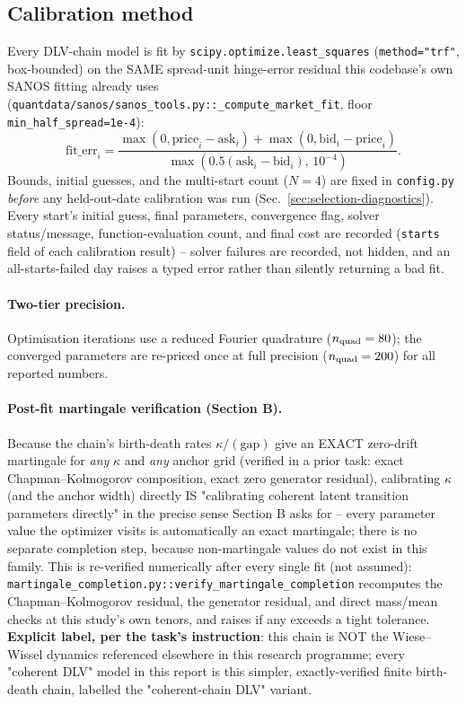 \subsection{Calibration method}
\label{sec:calibration-method}

Every DLV-chain model is fit by \texttt{scipy.optimize.least\_squares}
(\texttt{method="trf"}, box-bounded) on the SAME spread-unit hinge-error
residual this codebase's own SANOS fitting already uses
(\texttt{quantdata/sanos/sanos\_tools.py::\_compute\_market\_fit}, floor
\texttt{min\_half\_spread=1e-4}):
\[
  \text{fit\_err}_i = \frac{\max(0,\text{price}_i-\text{ask}_i) + \max(0,\text{bid}_i-\text{price}_i)}
                            {\max(0.5(\text{ask}_i-\text{bid}_i),\,10^{-4})}.
\]
Bounds, initial guesses, and the multi-start count ($N=4$) are fixed in
\texttt{config.py} \emph{before} any held-out-date calibration was run
(Sec.~\ref{sec:selection-diagnostics}). Every start's initial guess, final
parameters, convergence flag, solver status/message, function-evaluation
count, and final cost are recorded (\texttt{starts} field of each
calibration result) -- solver failures are recorded, not hidden, and an
all-starts-failed day raises a typed error rather than silently returning a
bad fit.

\paragraph{Two-tier precision.} Optimisation iterations use a reduced
Fourier quadrature ($n_{\rm quad}=80$); the converged parameters are
re-priced once at full precision ($n_{\rm quad}=200$) for all reported
numbers.

\paragraph{Post-fit martingale verification (Section B).} Because the
chain's birth-death rates $\kappa/(\text{gap})$ give an EXACT zero-drift
martingale for \emph{any} $\kappa$ and \emph{any} anchor grid (verified in
a prior task: exact Chapman--Kolmogorov composition, exact zero generator
residual), calibrating $\kappa$ (and the anchor width) directly IS
"calibrating coherent latent transition parameters directly" in the
precise sense Section B asks for -- every parameter value the optimizer
visits is automatically an exact martingale; there is no separate
completion step, because non-martingale values do not exist in this
family. This is re-verified numerically after every single fit (not
assumed): \texttt{martingale\_completion.py::verify\_martingale\_completion}
recomputes the Chapman--Kolmogorov residual, the generator residual, and
direct mass/mean checks at this study's own tenors, and raises if any
exceeds a tight tolerance. \textbf{Explicit label, per the task's
instruction}: this chain is NOT the Wiese--Wissel dynamics referenced
elsewhere in this research programme; every "coherent DLV" model in this
report is this simpler, exactly-verified finite birth-death chain,
labelled the "coherent-chain DLV" variant.
